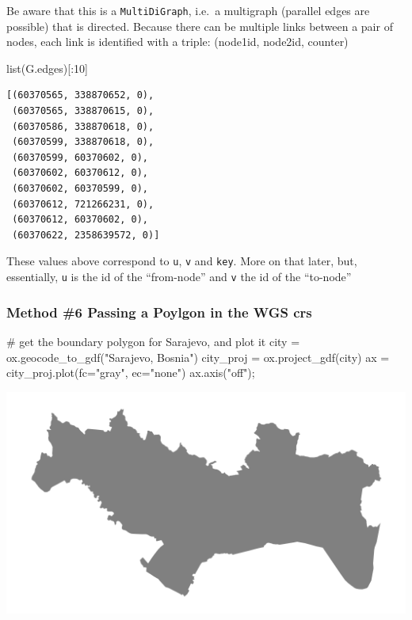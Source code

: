 \documentclass[
  letterpaper,
  DIV=11,
  numbers=noendperiod]{scrreprt}
\newenvironment{Shaded}{\begin{snugshade}}{\end{snugshade}}
\newcommand{\BuiltInTok}[1]{\textcolor[rgb]{0.00,0.23,0.31}{#1}}
\newcommand{\CommentTok}[1]{\textcolor[rgb]{0.37,0.37,0.37}{#1}}
\newcommand{\DecValTok}[1]{\textcolor[rgb]{0.68,0.00,0.00}{#1}}
\newcommand{\NormalTok}[1]{\textcolor[rgb]{0.00,0.23,0.31}{#1}}
\newcommand{\OperatorTok}[1]{\textcolor[rgb]{0.37,0.37,0.37}{#1}}
\newcommand{\StringTok}[1]{\textcolor[rgb]{0.13,0.47,0.30}{#1}}
\begin{document}
Be aware that this is a \texttt{MultiDiGraph}, i.e.~a multigraph
(parallel edges are possible) that is directed. Because there can be
multiple links between a pair of nodes, each link is identified with a
triple: (node1id, node2id, counter)

\begin{Shaded}
\begin{Highlighting}[]
\BuiltInTok{list}\NormalTok{(G.edges)[:}\DecValTok{10}\NormalTok{]}
\end{Highlighting}
\end{Shaded}

\begin{verbatim}
[(60370565, 338870652, 0),
 (60370565, 338870615, 0),
 (60370586, 338870618, 0),
 (60370599, 338870618, 0),
 (60370599, 60370602, 0),
 (60370602, 60370612, 0),
 (60370602, 60370599, 0),
 (60370612, 721266231, 0),
 (60370612, 60370602, 0),
 (60370622, 2358639572, 0)]
\end{verbatim}

These values above correspond to \texttt{u}, \texttt{v} and
\texttt{key}. More on that later, but, essentially, \texttt{u} is the id
of the ``from-node'' and \texttt{v} the id of the ``to-node''

\subsubsection{Method \#6 Passing a Poylgon in the WGS
crs}\label{method-6-passing-a-poylgon-in-the-wgs-crs}

\begin{Shaded}
\begin{Highlighting}[]
\CommentTok{\# get the boundary polygon for Sarajevo, and plot it}
\NormalTok{city }\OperatorTok{=}\NormalTok{ ox.geocode\_to\_gdf(}\StringTok{"Sarajevo, Bosnia"}\NormalTok{)}
\NormalTok{city\_proj }\OperatorTok{=}\NormalTok{ ox.project\_gdf(city)}
\NormalTok{ax }\OperatorTok{=}\NormalTok{ city\_proj.plot(fc}\OperatorTok{=}\StringTok{"gray"}\NormalTok{, ec}\OperatorTok{=}\StringTok{"none"}\NormalTok{)}
\NormalTok{ax.axis(}\StringTok{"off"}\NormalTok{)}\OperatorTok{;}
\end{Highlighting}
\end{Shaded}

\includegraphics{labs/w07_OSM_files/figure-pdf/cell-13-output-1.png}
\end{document}
